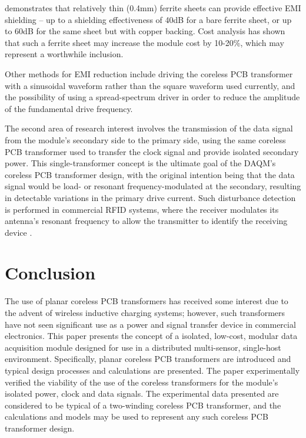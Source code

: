 \documentclass[conference]{IEEEtran}
\begin{document}
\cite{EMIShield} demonstrates that relatively thin (0.4mm) ferrite sheets can provide effective EMI shielding -- up to a shielding effectiveness of 40dB for a bare ferrite sheet, or up to 60dB for the same sheet but with copper backing.  Cost analysis has shown that such a ferrite sheet may increase the module cost by 10-20\%, which may represent a worthwhile inclusion.

Other methods for EMI reduction include driving the coreless PCB transformer with a sinusoidal waveform rather than the square waveform used currently, and the possibility of using a spread-spectrum driver in order to reduce the amplitude of the fundamental drive frequency.

The second area of research interest involves the transmission of the data signal from the module's secondary side to the primary side, using the same coreless PCB transformer used to transfer the clock signal and provide isolated secondary power.  This single-transformer concept is the ultimate goal of the DAQM's coreless PCB transformer design, with the original intention being that the data signal would be load- or resonant frequency-modulated at the secondary, resulting in detectable variations in the primary drive current.  Such disturbance detection is performed in commercial RFID systems, where the receiver modulates its antenna's resonant frequency to allow the transmitter to identify the receiving device \cite{RFID}.

\section{Conclusion}
The use of planar coreless PCB transformers has received some interest due to the advent of wireless inductive charging systems; however, such transformers have not seen significant use as a power and signal transfer device in commercial electronics.  This paper presents the concept of a isolated, low-cost, modular data acquisition module designed for use in a distributed multi-sensor, single-host environment.  Specifically, planar coreless PCB transformers are introduced and typical design processes and calculations are presented.  The paper experimentally verified the viability of the use of the coreless transformers for the module's isolated power, clock and data signals.  The experimental data presented are considered to be typical of a two-winding coreless PCB transformer, and the calculations and models may be used to represent any such coreless PCB transformer design.  
\end{document}

